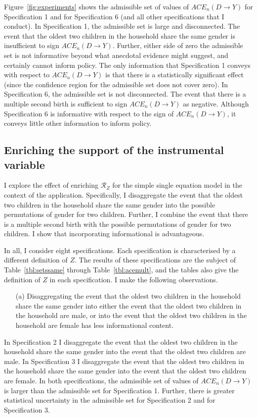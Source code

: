 \documentclass[12pt,a4paper,twoside]{article}
\numberwithin{equation}{section}
\begin{document}
Figure~\ref{fig:experiments} shows the admissible set of values of $ACE_n(D\rightarrow Y)$ for Specification 1 and for Specification 6 (and all other specifications that I conduct). In Specification 1, the admissible set is large and disconnected. The event that the oldest two children in the household share the same gender is insufficient to sign $ACE_n(D\rightarrow Y)$. Further, either side of zero the admissible set is not informative beyond what anecdotal evidence might suggest, and certainly cannot inform policy. The only information that Specification 1 conveys with respect to $ACE_n(D\rightarrow Y)$ is that there is a statistically significant effect (since the confidence region for the admissible set does not cover zero). In Specification 6, the admissible set is not disconnected. The event that there is a multiple second birth is sufficient to sign $ACE_n(D\rightarrow Y)$ as negative. Although Specification 6 is informative with respect to the sign of $ACE_n(D\rightarrow Y)$, it conveys little other information to inform policy.  
\subsection{Enriching the support of the instrumental variable}
I explore the effect of enriching $\mathcal{R}_Z$ for the simple single equation model in the context of the application. Specifically, I disaggregate the event that the oldest two children in the household share the same gender into the possible permutations of gender for two children. Further, I combine the event that there is a multiple second birth with the possible permutations of gender for two children. I show that incorporating informational is advantageous.

In all, I consider eight specifications. Each specification is characterised by a different definition of $Z$. The results of these specifications are the subject of Table~\ref{tbl:setssame} through Table~\ref{tbl:acemult}, and the tables also give the definition of $Z$ in each specification. I make the following observations.
\begin{enumerate}
\item[(a)] Disaggregating the event that the oldest two children in the household share the same gender into either the event that the oldest two children in the household are male, or into the event that the oldest two children in the household are female has less informational content.
\end{enumerate}
In Specification 2 I disaggregate the event that the oldest two children in the household share the same gender into the event that the oldest two children are male. In Specification 3 I disaggregate the event that the oldest two children in the household share the same gender into the event that the oldest two children are female. In both specifications, the admissible set of values of $ACE_n(D\rightarrow Y)$ is larger than the admissible set for Specification 1. Further, there is greater statistical uncertainty in the admissible set for Specification 2 and for Specification 3.  
\end{document}
